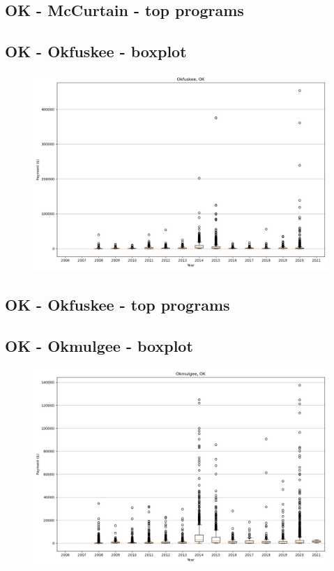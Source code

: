 \subsection*{OK - McCurtain - top programs}

\newpage
\subsection*{OK - Okfuskee - boxplot}
\begin{figure}[h]
\centering
\includegraphics[width=7in]{../output/boxplots/counties/Okfuskee-OK_boxplot.png}
\end{figure}


\subsection*{OK - Okfuskee - top programs}

\newpage
\subsection*{OK - Okmulgee - boxplot}
\begin{figure}[h]
\centering
\includegraphics[width=7in]{../output/boxplots/counties/Okmulgee-OK_boxplot.png}
\end{figure}


